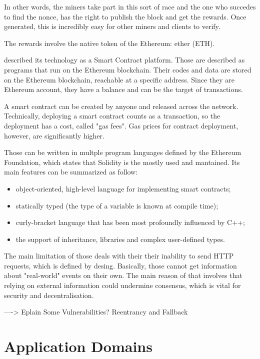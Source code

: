 In other words, the miners take part in this sort of race and the one who succedes to find the nonce, has the right to publish the block and get the rewards. 
Once generated, this is incredibly easy for other miners and clients to verify. 

The rewards involve the native token of the Ethereum: ether (ETH). 

\citet{EthDocs} described its technology as a Smart Contract platform.
Those are described as programs that run on the Ethereum blockchain. 
Their codes and data are stored on the Ethereum blockchain, reachable at a specific address.
Since they are Ethereum account, they have a balance and can be the target of transactions. 

A smart contract can be created by anyone and released across the network.
Technically, deploying a smart contract counts as a transaction, so the deployment has a cost, called "gas fees".
Gas prices for contract deployment, however, are significantly higher. 

Those can be written in multple program languages defined by the Ethereum Foundation, which states that Solidity is the mostly used and mantained.
Its main features can be summarized as follow: 
\begin{itemize}
    \item object-oriented, high-level language for implementing smart contracts;
    \item statically typed (the type of a variable is known at compile time);
    \item curly-bracket language that has been most profoundly influenced by C++;
    \item the support of inheritance, libraries and complex user-defined types.
\end{itemize}

The main limitation of those deals with their their inability to send HTTP requests, which is defined by desing. 
Basically, those cannot get information about "real-world" events on their own. 
The main reason of that involves that relying on external information could undermine consensus, which is vital for security and decentralisation. 

----> Eplain Some Vulnerabilities? Reentrancy and Fallback

\section{Application Domains}

